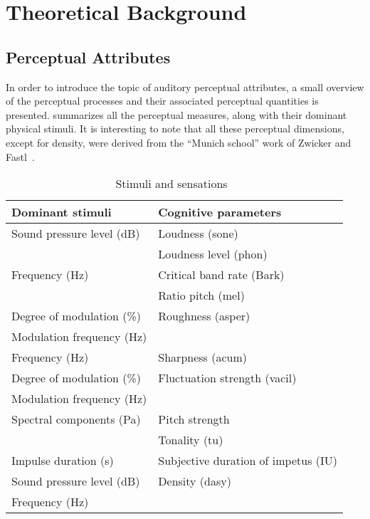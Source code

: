 \documentclass[../main.tex]{subfiles}
\begin{document}
\chapter{Theoretical Background}

\begin{theoreticalbackground}

\section{Perceptual Attributes}

In order to introduce the topic of auditory perceptual attributes, a small
overview of the perceptual processes and their associated perceptual quantities
is presented.  summarizes all the perceptual measures, along
with their dominant physical stimuli. It is interesting to note that all these
perceptual dimensions, except for density, were derived from the
``Munich school'' work of Zwicker and Fastl~\cite{Fastl2007Psychoacoustics}.

\begin{table}[ht]
  \centering
  \begin{tabu}{ l l }
    \toprule
    \rowfont\bfseries
    Dominant stimuli & Cognitive parameters \\
    \midrule
    Sound pressure level (dB) & Loudness (sone) \\
    & Loudness level (phon) \\
    \midrule
    Frequency (Hz) & Critical band rate (Bark) \\
    & Ratio pitch (mel) \\
    \midrule
    Degree of modulation (\%) & Roughness (asper)\\
    Modulation frequency (Hz) & \\
    \midrule
    Frequency (Hz) & Sharpness (acum) \\
    \midrule
    Degree of modulation (\%) & Fluctuation strength (vacil) \\
    Modulation frequency (Hz) & \\
    \midrule
    Spectral components (Pa) & Pitch strength \\
    & Tonality (tu) \\
    \midrule
    Impulse duration (s) & Subjective duration of impetus (IU) \\
    \midrule
    Sound pressure level (dB) & Density (dasy) \\
    Frequency (Hz) & \\
    \bottomrule
  \end{tabu}
  \caption{Stimuli and sensations~\cite[pp.~70]{Mueller2012Handbook}}
  \label{tab:stimsens}
\end{table}


\end{theoreticalbackground}
\end{document}
